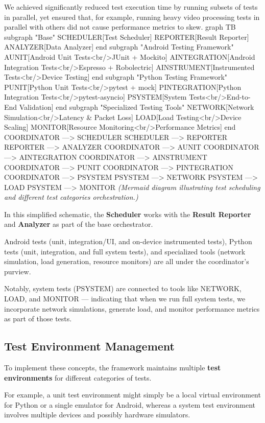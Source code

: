 {{{We achieved significantly reduced test execution time by running subsets of tests in parallel, yet ensured that, for example, running heavy video processing tests in parallel with others did not cause performance metrics to skew. graph TB subgraph "Base" SCHEDULER[Test Scheduler] REPORTER[Result Reporter] ANALYZER[Data Analyzer] end subgraph "Android Testing Framework" AUNIT[Android Unit Tests<br/>JUnit + Mockito] AINTEGRATION[Android Integration Tests<br/>Espresso + Robolectric] AINSTRUMENT[Instrumented Tests<br/>Device Testing] end subgraph "Python Testing Framework" PUNIT[Python Unit Tests<br/>pytest + mock] PINTEGRATION[Python Integration Tests<br/>pytest-asyncio] PSYSTEM[System Tests<br/>End-to-End Validation] end subgraph "Specialized Testing Tools" NETWORK[Network Simulation<br/>Latency \& Packet Loss] LOAD[Load Testing<br/>Device Scaling] MONITOR[Resource Monitoring<br/>Performance Metrics] end COORDINATOR ---> SCHEDULER SCHEDULER ---> REPORTER REPORTER ---> ANALYZER COORDINATOR ---> AUNIT COORDINATOR ---> AINTEGRATION COORDINATOR ---> AINSTRUMENT COORDINATOR ---> PUNIT COORDINATOR ---> PINTEGRATION COORDINATOR ---> PSYSTEM PSYSTEM ---> NETWORK PSYSTEM ---> LOAD PSYSTEM ---> MONITOR \textit{(Mermaid diagram illustrating test scheduling and different test categories orchestration.)}

In this simplified schematic, the \textbf{Scheduler}
 works with the \textbf{Result Reporter}
 and \textbf{Analyzer}
 as part of the base orchestrator.

Android tests (unit, integration/UI, and on-device instrumented tests), Python tests (unit, integration, and full system tests), and specialized tools (network simulation, load generation, resource monitors) are all under the coordinator's purview.

Notably, system tests (PSYSTEM) are connected to tools like NETWORK, LOAD, and MONITOR --- indicating that when we run full system tests, we incorporate network simulations, generate load, and monitor performance metrics as part of those tests.

\subsection{Test Environment Management}

To implement these concepts, the framework maintains multiple \textbf{test environments}
 for different categories of tests.

For example, a unit test environment might simply be a local virtual environment for Python or a single emulator for Android, whereas a system test environment involves multiple devices and possibly hardware simulators.

}}}
